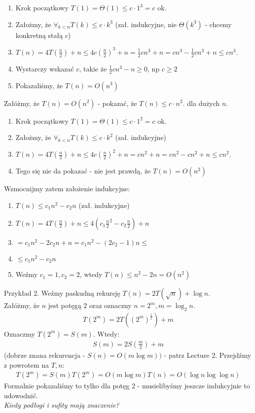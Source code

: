 \documentclass{article}
\begin{document}
\begin{enumerate}
    \item Krok początkowy $T(1) = \Theta(1) \leq c\cdot 1^3 = c$ ok.
    \item Założmy, że $\forall_{k<n}  T(k) \leq c\cdot k^3$ (zał. indukcyjne, nie $\Theta(k^3)$ - chcemy konkretną stałą $c$)
    \item $T(n) = 4T\left(\frac{n}{2}\right) + n \leq 4c\left(\frac{n}{2}\right)^3 + n = \frac{1}{2}cn^3 + n = cn^3 - \frac{1}{2}cn^3 + n \leq cn^3$.
    \item Wystarczy wskazać $c$, takie że $\frac{1}{2}cn^3 - n \geq 0$, np $c\geq 2$
    \item Pokazaliśmy, że $T(n) = O(n^3)$
\end{enumerate}
Załóżmy, że $T(n)=O(n^2)$ - pokazać, że $T(n)\leq c\cdot n^2$. dla dużych $n$.
\begin{enumerate}
    \item Krok początkowy $T(1) = \Theta(1) \leq c\cdot 1^2 = c$ ok.
    \item Założmy, że $\forall_{k<n}  T(k) \leq c\cdot k^2$ (zał. indukcyjne)
    \item $T(n) = 4T\left(\frac{n}{2}\right) + n \leq 4c\left(\frac{n}{2}\right)^2 + n = cn^2 + n = cn^2 - cn^2 + n \leq cn^2$.
    \item Tego się nie da pokazać - nie jest prawdą, że $T(n) = O(n^2)$
\end{enumerate}
Wzmocnijmy zatem założenie indukcyjne:
\begin{enumerate}
    \item $T(n) \leq c_1 n^2 - c_2 n$ (zał. indukcyjne)
    \item $T(n) = 4T\left(\frac{n}{2}\right) + n \leq 4(c_1 \frac{n}{2}^2 - c_2 \frac{n}{2}) + n$
    \item $= c_1 n^2 - 2c_2 n + n = c_1n^2 - (2c_2 -1)n \leq$
    \item $\leq c_1n^2 - c_2n$
    \item Weźmy $c_1=1, c_2=2$, wtedy $T(n) \leq n^2 - 2n = O(n^2)$
\end{enumerate}

\noindent
Przykład 2. Weźmy paskudną rekursję $T(n) = 2T(\sqrt{n}) + \log n$.\\
Załóżmy, że $n$ jest potęgą $2$ oraz oznaczny $n=2^m, m=\log_2 n$.
\begin{align}
    T(2^m) = 2T((2^m)^\frac{1}{2}) + m
\end{align}
Oznaczmy $T(2^m) = S(m)$. Wtedy:
\begin{align}
    S(m) = 2S\left(\frac{m}{2}\right) + m
\end{align}
(dobrze znana rekurencja - $S(n) = O(m\log m))$ - patrz Lecture 2.
Przejdźmy z powrotem na $T,n$:
\begin{align}
    T(2^m) = S(m)
    T(2^m) = O(m \log m)
    T(n) = O(\log n \log \log n)
\end{align}
Formalnie pokazaliśmy to tylko dla potęg $2$ - musielibyśmy jeszcze indukcyjnie to udowodnić.\\

\textit{Kiedy podłogi i sufity mają znaczenie?}
\end{document}
